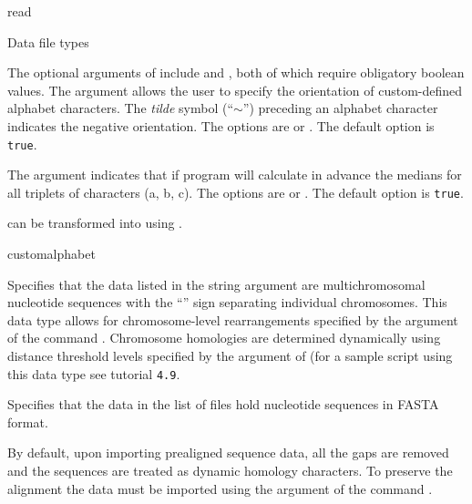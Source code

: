 \begin{command}{read}{}
\begin{arguments}
\begin{argumentgroup}{Data file types}
{	The optional arguments of  include 
	and , both of which require obligatory boolean values. The argument
	 allows the user to specify the orientation of custom-defined alphabet
	characters. The \emph{tilde} symbol (``$\sim$'') preceding an alphabet character indicates
	the negative orientation. The options are 
	or . The default option is \texttt{true}.
	
	The argument  indicates that if program will calculate in advance
	the medians for all triplets of characters (a, b, c). The options are  or
	. The default option is \texttt{true}.
	
	can be transformed into  using .}
	 {customalphabet}
        
            {Specifies that the data listed in the string argument are
            multichromosomal nucleotide sequences with the ``\atsymbol'' sign 
            separating individual chromosomes. This data type
            allows for chromosome-level rearrangements specified by
            the argument
             of the command
            . Chromosome
            homologies are determined dynamically using distance
            threshold levels specified by the argument
            of (for a sample script using this data type see tutorial \texttt{4.9}.} 
            {}
            
            {Specifies that the data in the list of files hold nucleotide
            sequences in FASTA format.} 
            {}
            
	\begin{statement}
            By default, upon importing prealigned sequence data, all the gaps are
             removed and the sequences are treated as dynamic homology characters.
             To preserve the alignment the data must be imported using the
              argument of the command .
          \end{statement}
        

\end{argumentgroup}
\end{arguments}
\end{command}
